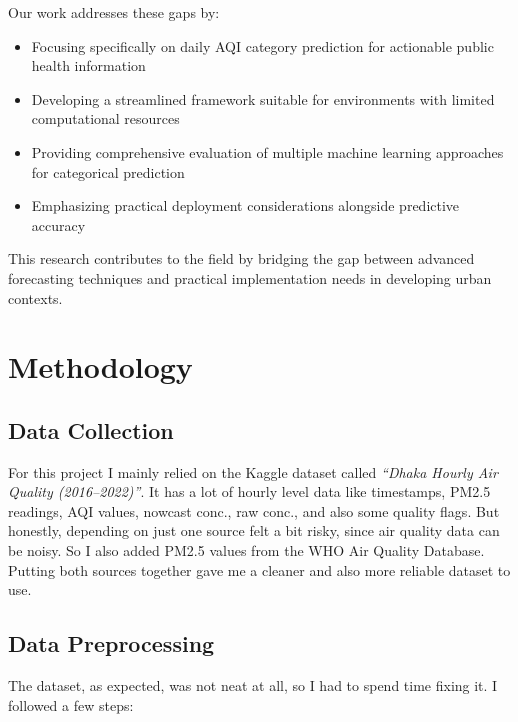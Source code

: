\documentclass[a4paper,fleqn]{cas-dc}
\begin{document}
Our work addresses these gaps by:
\begin{itemize}
    \item Focusing specifically on daily AQI category prediction for actionable public health information
    \item Developing a streamlined framework suitable for environments with limited computational resources
    \item Providing comprehensive evaluation of multiple machine learning approaches for categorical prediction
    \item Emphasizing practical deployment considerations alongside predictive accuracy
\end{itemize}

This research contributes to the field by bridging the gap between advanced forecasting techniques and practical implementation needs in developing urban contexts.




\section{Methodology}\label{sec:methodology}




\subsection{Data Collection}
For this project I mainly relied on the Kaggle dataset called \textit{``Dhaka Hourly Air Quality (2016--2022)''}. It has a lot of hourly level data like timestamps, PM2.5 readings, AQI values, nowcast conc., raw conc., and also some quality flags. But honestly, depending on just one source felt a bit risky, since air quality data can be noisy. So I also added PM2.5 values from the WHO Air Quality Database. Putting both sources together gave me a cleaner and also more reliable dataset to use.

\subsection{Data Preprocessing}
The dataset, as expected, was not neat at all, so I had to spend time fixing it. I followed a few steps:
\end{document}

